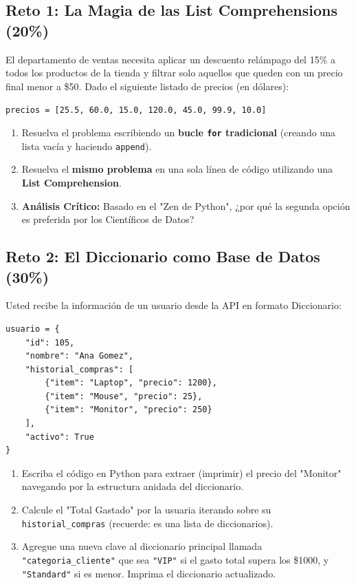 \documentclass[12pt,a4paper]{article}
\begin{document}
\subsection*{Reto 1: La Magia de las List Comprehensions (20\%)}
El departamento de ventas necesita aplicar un descuento relámpago del 15\% a todos los productos de la tienda y filtrar solo aquellos que queden con un precio final menor a \$50. 
Dado el siguiente listado de precios (en dólares):
\begin{center}
    \texttt{precios = [25.5, 60.0, 15.0, 120.0, 45.0, 99.9, 10.0]}
\end{center}
\begin{enumerate}
    \item Resuelva el problema escribiendo un \textbf{bucle \texttt{for} tradicional} (creando una lista vacía y haciendo \texttt{append}).
    \item Resuelva el \textbf{mismo problema} en una sola línea de código utilizando una \textbf{List Comprehension}.
    \item \textbf{Análisis Crítico:} Basado en el "Zen de Python", ¿por qué la segunda opción es preferida por los Científicos de Datos?
\end{enumerate}

\subsection*{Reto 2: El Diccionario como Base de Datos (30\%)}
Usted recibe la información de un usuario desde la API en formato Diccionario:
\begin{verbatim}
usuario = {
    "id": 105,
    "nombre": "Ana Gomez",
    "historial_compras": [
        {"item": "Laptop", "precio": 1200},
        {"item": "Mouse", "precio": 25},
        {"item": "Monitor", "precio": 250}
    ],
    "activo": True
}
\end{verbatim}
\begin{enumerate}
    \item Escriba el código en Python para extraer (imprimir) el precio del "Monitor" navegando por la estructura anidada del diccionario.
    \item Calcule el "Total Gastado" por la usuaria iterando sobre su \texttt{historial\_compras} (recuerde: es una lista de diccionarios).
    \item Agregue una nueva clave al diccionario principal llamada \texttt{"categoria\_cliente"} que sea \texttt{"VIP"} si el gasto total supera los \$1000, y \texttt{"Standard"} si es menor. Imprima el diccionario actualizado.
\end{enumerate}
\end{document}
